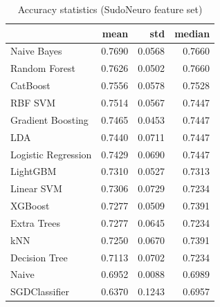 \begin{table}
\caption{Accuracy statistics (SudoNeuro feature set)}
\label{tab:accuracy_SudoNeuro_stats}
\begin{tabular}{lrrr}
\toprule
 & mean & std & median \\
\midrule
Naive Bayes & 0.7690 & 0.0568 & 0.7660 \\
Random Forest & 0.7626 & 0.0502 & 0.7660 \\
CatBoost & 0.7556 & 0.0578 & 0.7528 \\
RBF SVM & 0.7514 & 0.0567 & 0.7447 \\
Gradient Boosting & 0.7465 & 0.0453 & 0.7447 \\
LDA & 0.7440 & 0.0711 & 0.7447 \\
Logistic Regression & 0.7429 & 0.0690 & 0.7447 \\
LightGBM & 0.7310 & 0.0527 & 0.7313 \\
Linear SVM & 0.7306 & 0.0729 & 0.7234 \\
XGBoost & 0.7277 & 0.0509 & 0.7391 \\
Extra Trees & 0.7277 & 0.0645 & 0.7234 \\
kNN & 0.7250 & 0.0670 & 0.7391 \\
Decision Tree & 0.7113 & 0.0702 & 0.7234 \\
Naive & 0.6952 & 0.0088 & 0.6989 \\
SGDClassifier & 0.6370 & 0.1243 & 0.6957 \\
\bottomrule
\end{tabular}
\end{table}
